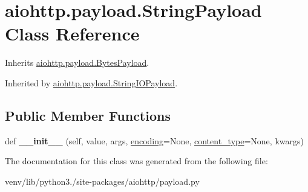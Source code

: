 \hypertarget{classaiohttp_1_1payload_1_1_string_payload}{}\section{aiohttp.\+payload.\+String\+Payload Class Reference}
\label{classaiohttp_1_1payload_1_1_string_payload}


Inherits \hyperlink{classaiohttp_1_1payload_1_1_bytes_payload}{aiohttp.\+payload.\+Bytes\+Payload}.



Inherited by \hyperlink{classaiohttp_1_1payload_1_1_string_i_o_payload}{aiohttp.\+payload.\+String\+I\+O\+Payload}.

\subsection*{Public Member Functions}
\begin{DoxyCompactItemize}
\item 
\mbox{\label{classaiohttp_1_1payload_1_1_string_payload_ab836e9e18af12bb7d996374151f42aeb}} 
def {\bfseries \+\_\+\+\_\+init\+\_\+\+\_\+} (self, value, args, \hyperlink{classaiohttp_1_1payload_1_1_payload_a32f545f68c7bf65bee28f566b35edb4e}{encoding}=None, \hyperlink{classaiohttp_1_1payload_1_1_payload_ab7f478716f0cb49905362cc8faf06ec3}{content\+\_\+type}=None, kwargs)
\end{DoxyCompactItemize}


The documentation for this class was generated from the following file\+:\begin{DoxyCompactItemize}
\item 
venv/lib/python3./site-\/packages/aiohttp/payload.\+py\end{DoxyCompactItemize}
